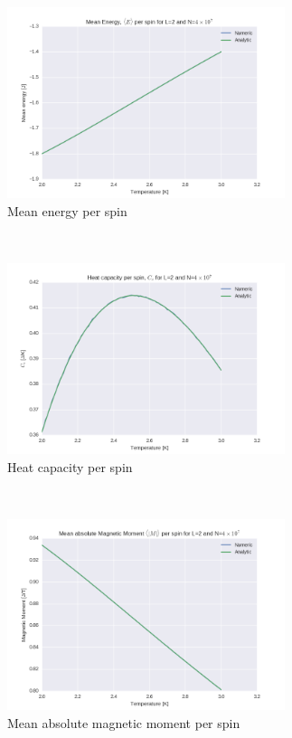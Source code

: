 \documentclass[a4paper, 10pt]{article}
\begin{document}
\begin{figure}[!ht]
    \centering
    \begin{subfigure}[H!]{0.5\textwidth}
        \centering
        \includegraphics[height=2.2in]{L2MeanEner4e7.png}
        \caption{Mean energy per spin}
    \end{subfigure}%
    ~ 
    \begin{subfigure}[H!]{0.5\textwidth}
        \centering
        \includegraphics[height=2.2in]{L2Cv4e7.png}
        \caption{Heat capacity per spin}
    \end{subfigure}
    ~
     \begin{subfigure}[H!]{0.5\textwidth}
        \centering
        \includegraphics[height=2.2in]{L2MeanabsMag4e7.png}
        \caption{Mean absolute magnetic moment per spin}
    \end{subfigure}%
    ~ 
    \begin{subfigure}[H!]{0.5\textwidth}

\end{subfigure}
\end{figure}
\end{document}
